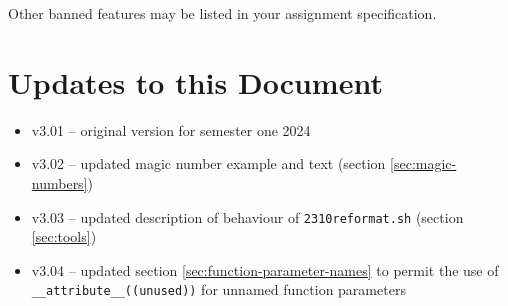 \documentclass{article}
\begin{document}
\noindent Other banned features may be listed in your assignment specification.

\section{Updates to this Document}
\begin{itemize}
\item v3.01 -- original version for semester one 2024
\item v3.02 -- updated magic number example and text (section \ref{sec:magic-numbers})
\item v3.03 -- updated description of behaviour of \texttt{2310reformat.sh} (section \ref{sec:tools})
\item v3.04 -- updated section \ref{sec:function-parameter-names} to permit the use of \texttt{__attribute__((unused))} for unnamed function parameters
\end{itemize}
\end{document}

